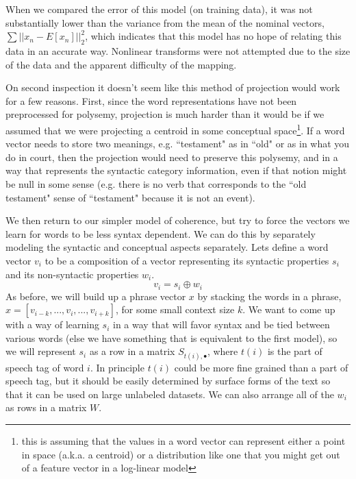\documentclass[11pt,letterpaper]{article}
\begin{document}
When we compared the error of this model (on training data), it
was not substantially lower than the variance from the mean of the nominal vectors,
$\sum ||x_n - E[x_n]||_2^2$, which indicates that this model has no hope
of relating this data in an accurate way. Nonlinear transforms were not attempted
due to the size of the data and the apparent difficulty of the mapping.


On second inspection it doesn't seem like this method of projection would work for a few reasons.
First, since the word representations have not been preprocessed for polysemy, projection is much harder than
it would be if we assumed that we were projecting a centroid in some conceptual space\footnote{this
is assuming that the values in a word vector can represent either a point in space (a.k.a. a centroid)
or a distribution like one that you might get out of a feature vector in a log-linear model}.
If a word vector needs to store two meanings, e.g. ``testament" as in ``old" or as in what you do in court,
then the projection would need to preserve this polysemy, and in a way that represents the
syntactic category information, even if that notion might be null in some sense
(e.g. there is no verb that corresponds to the ``old testament" sense of ``testament" because it is not an event).


We then return to our simpler model of coherence,
but try to force the vectors we learn for words to be less syntax dependent.
We can do this by separately modeling the syntactic and conceptual aspects separately.
Lets define a word vector $v_i$ to be a composition of a vector representing its
syntactic properties $s_i$ and its non-syntactic properties $w_i$.
\[
	v_i = s_i \oplus w_i
\]
As before, we will build up a phrase vector $x$ by stacking the words in a phrase,
$x = [v_{i-k}, ..., v_i, ..., v_{i+k}]$, for some small context size $k$.
We want to come up with a way of learning $s_i$ in a way that will favor syntax and
be tied between various words (else we have something that is equivalent to the first model),
so we will represent $s_i$ as a row in a matrix $S_{t(i),\bullet}$,
where $t(i)$ is the part of speech tag of word $i$. In principle $t(i)$ could be more
fine grained than a part of speech tag, but it should be easily determined by surface
forms of the text so that it can be used on large unlabeled datasets.
We can also arrange all of the $w_i$ as rows in a matrix $W$.
\end{document}
